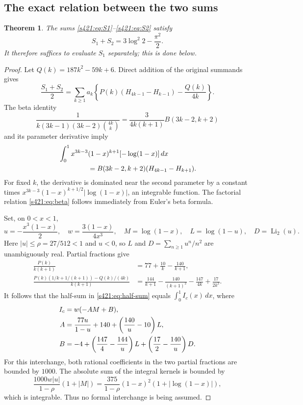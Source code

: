 \documentclass[11pt,a4paper]{article}
\newtheorem{theorem}{Theorem}[section]
\theoremstyle{remark}\newtheorem{remark}[theorem]{Remark}
\newcommand{\Li}{\operatorname{Li}_2}
\numberwithin{equation}{section}
\begin{document}
\subsection{The exact relation between the two sums}
\begin{theorem}\label{s421:thm:sum}
The sums \eqref{s421:eq:S1}--\eqref{s421:eq:S2} satisfy
\begin{equation}\label{s421:eq:sum-result}
 S_1+S_2=3\log^2 2-\frac{\pi^2}{2}.
\end{equation}
It therefore suffices to evaluate $S_1$ separately; this is done below.
\end{theorem}
\begin{proof}
Let $Q(k)=187k^2-59k+6$. Direct addition of the original summands gives
\begin{equation}\label{s421:eq:half-sum}
 \frac{S_1+S_2}{2}
 =\sum_{k\ge1}a_k\left\{P(k)(H_{4k-1}-H_{k-1})-\frac{Q(k)}{4k}\right\}.
\end{equation}
The beta identity
\begin{equation}\label{s421:eq:beta}
 \frac1{k(3k-1)(3k-2)\binom{4k}{k}}
 =\frac{3}{4k(k+1)}B(3k-2,k+2)
\end{equation}
and its parameter derivative imply
\begin{align*}
 &\int_0^1x^{3k-3}(1-x)^{k+1}[-\log(1-x)]\,dx\\
 &\hspace{15mm}=B(3k-2,k+2)(H_{4k-1}-H_{k+1}).
\end{align*}
For fixed $k$, the derivative is dominated near the second parameter by a constant times
$x^{3k-3}(1-x)^{k+1/2}|\log(1-x)|$, an integrable function. The factorial relation \eqref{s421:eq:beta} follows immediately from Euler's beta formula.

Set, on $0<x<1$,
\begin{equation}\label{s421:eq:variables}
 u=-\frac{x^3(1-x)}2,\quad w=\frac{3(1-x)}{4x^3},\quad
 M=\log(1-x),\quad L=\log(1-u),\quad D=\Li(u).
\end{equation}
Here $|u|\le\rho=27/512<1$ and $u<0$, so $L$ and $D=\sum_{n\ge1}u^n/n^2$ are unambiguously real. Partial fractions give
\begin{align*}
 \frac{P(k)}{k(k+1)}&=77+\frac{10}{k}-\frac{140}{k+1},\\
 \frac{P(k)(1/k+1/(k+1))-Q(k)/(4k)}{k(k+1)}
 &=\frac{144}{k+1}-\frac{140}{(k+1)^2}-\frac{147}{4k}+\frac{17}{2k^2}.
\end{align*}
It follows that the half-sum in \eqref{s421:eq:half-sum} equals $\int_0^1I_c(x)\,dx$, where
\begin{align}
 I_c&=w(-AM+B),\label{s421:eq:Ic}\\
 A&=\frac{77u}{1-u}+140+\left(\frac{140}{u}-10\right)L,\notag\\
 B&=-4+\left(\frac{147}{4}-\frac{144}{u}\right)L
       +\left(\frac{17}{2}-\frac{140}{u}\right)D.\notag
\end{align}
For this interchange, both rational coefficients in the two partial fractions are bounded by $1000$. The absolute sum of the integral kernels is bounded by
\[
 \frac{1000w|u|}{1-\rho}(1+|M|)
 =\frac{375}{1-\rho}(1-x)^2(1+|\log(1-x)|),
\]
which is integrable. Thus no formal interchange is being assumed.


\end{proof}
\end{document}

